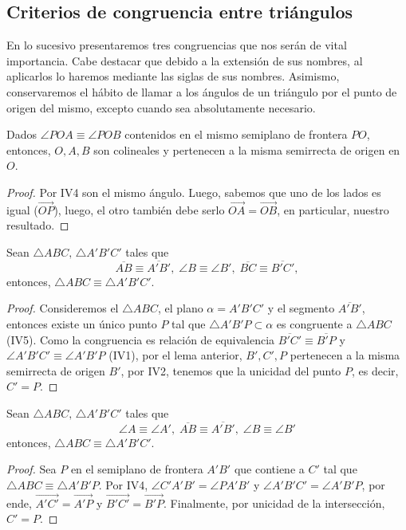 \documentclass[11pt,a4paper]{book}
\begin{document}
\subsection*{Criterios de congruencia entre triángulos}
En lo sucesivo presentaremos tres congruencias que nos serán de vital importancia. Cabe destacar que debido a la extensión de sus nombres, al aplicarlos lo haremos mediante las siglas de sus nombres. Asimismo, conservaremos el hábito de llamar a los ángulos de un triángulo por el punto de origen del mismo, excepto cuando sea absolutamente necesario.
\begin{lem}
Dados $\angle POA\equiv\angle POB$ contenidos en el mismo semiplano de frontera $PO$, entonces, $O,A,B$ son colineales y pertenecen a la misma semirrecta de origen en $O$.
\end{lem}
\begin{proof}
Por IV4 son el mismo ángulo. Luego, sabemos que uno de los lados es igual ($\overrightarrow{OP}$), luego, el otro también debe serlo $\overrightarrow{OA}=\overrightarrow{OB}$, en particular, nuestro resultado.
\end{proof}
\begin{thm}
Sean $\triangle ABC,\,\triangle A'B'C'$ tales que
$$\overline{AB}\equiv\overline{A'B'},\;\angle B\equiv\angle B',\;\overline{BC}\equiv\overline{B'C'},$$
entonces, $\triangle ABC\equiv\triangle A'B'C'$.
\end{thm}
\begin{proof}
Consideremos el $\triangle ABC$, el plano $\alpha=A'B'C'$ y el segmento $\overline{A'B'}$, entonces existe un único punto $P$ tal que $\triangle A'B'P\subset\alpha$ es congruente a $\triangle ABC$ (IV5). Como la congruencia es relación de equivalencia $\overline{B'C'}\equiv\overline{B'P}$ y $\angle A'B'C'\equiv\angle A'B'P$ (IV1), por el lema anterior, $B',C',P$ pertenecen a la misma semirrecta de origen $B'$, por IV2, tenemos que la unicidad del punto $P$, es decir, $C'=P$.
\end{proof}
\begin{thm}
Sean $\triangle ABC,\,\triangle A'B'C'$ tales que
$$\angle A\equiv\angle A',\;\overline{AB}\equiv\overline{A'B'},\;\angle B\equiv\angle B'$$
entonces, $\triangle ABC\equiv\triangle A'B'C'$.
\end{thm}
\begin{proof}
Sea $P$ en el semiplano de frontera $A'B'$ que contiene a $C'$ tal que $\triangle ABC\equiv\triangle A'B'P$. Por IV4, $\angle C'A'B'=\angle PA'B'$ y $\angle A'B'C'=\angle A'B'P$, por ende, $\overrightarrow{A'C'}=\overrightarrow{A'P}$ y $\overrightarrow{B'C'}=\overrightarrow{B'P}$. Finalmente, por unicidad de la intersección, $C'=P$.
\end{proof}
\end{document}
